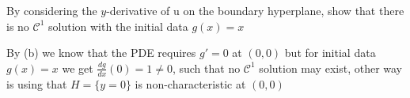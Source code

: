 \begin{question}
 By considering the $y$-derivative of u on the boundary hyperplane, show that there is no $\mathcal{C}^{1} $ solution with the initial data $g(x) = x$
\end{question}
\begin{solution}
By (b) we know that the PDE requires $g'= 0$ at $(0,0)$ but for initial data $g(x) = x $ we get $\frac{dg}{dx}(0) = 1 \neq 0$, such that no $\mathcal{C}^{1} $ solution may exist,
other way is using that $H = \{y=0\}  $ is non-characteristic at $(0,0)$
\end{solution}
